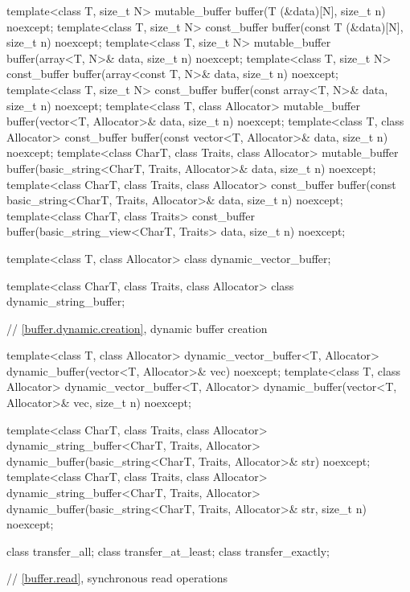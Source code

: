 \begin{codeblock}
{  template<class T, size_t N>
    mutable_buffer buffer(T (&data)[N], size_t n) noexcept;
  template<class T, size_t N>
    const_buffer buffer(const T (&data)[N], size_t n) noexcept;
  template<class T, size_t N>
    mutable_buffer buffer(array<T, N>& data, size_t n) noexcept;
  template<class T, size_t N>
    const_buffer buffer(array<const T, N>& data, size_t n) noexcept;
  template<class T, size_t N>
    const_buffer buffer(const array<T, N>& data, size_t n) noexcept;
  template<class T, class Allocator>
    mutable_buffer buffer(vector<T, Allocator>& data, size_t n) noexcept;
  template<class T, class Allocator>
    const_buffer buffer(const vector<T, Allocator>& data, size_t n) noexcept;
  template<class CharT, class Traits, class Allocator>
    mutable_buffer buffer(basic_string<CharT, Traits, Allocator>& data,
                          size_t n) noexcept;
  template<class CharT, class Traits, class Allocator>
    const_buffer buffer(const basic_string<CharT, Traits, Allocator>& data,
                        size_t n) noexcept;
  template<class CharT, class Traits>
    const_buffer buffer(basic_string_view<CharT, Traits> data,
                        size_t n) noexcept;

  template<class T, class Allocator>
    class dynamic_vector_buffer;

  template<class CharT, class Traits, class Allocator>
    class dynamic_string_buffer;

  // \ref{buffer.dynamic.creation}, dynamic buffer creation

  template<class T, class Allocator>
    dynamic_vector_buffer<T, Allocator>
    dynamic_buffer(vector<T, Allocator>& vec) noexcept;
  template<class T, class Allocator>
    dynamic_vector_buffer<T, Allocator>
    dynamic_buffer(vector<T, Allocator>& vec, size_t n) noexcept;

  template<class CharT, class Traits, class Allocator>
    dynamic_string_buffer<CharT, Traits, Allocator>
    dynamic_buffer(basic_string<CharT, Traits, Allocator>& str) noexcept;
  template<class CharT, class Traits, class Allocator>
    dynamic_string_buffer<CharT, Traits, Allocator>
    dynamic_buffer(basic_string<CharT, Traits, Allocator>& str, size_t n) noexcept;

  class transfer_all;
  class transfer_at_least;
  class transfer_exactly;

  // \ref{buffer.read}, synchronous read operations

}
\end{codeblock}
